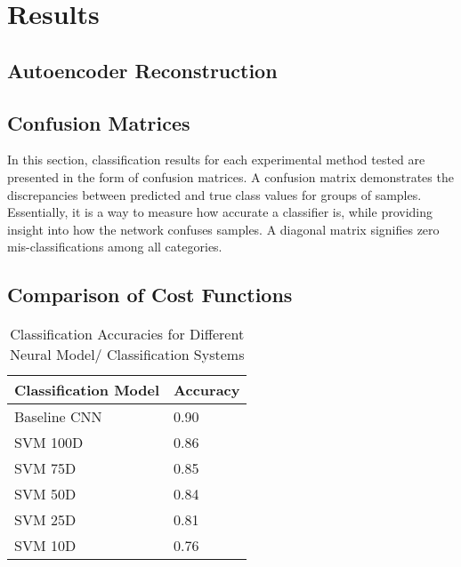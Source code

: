 \documentclass[conference]{IEEEtran}
\begin{document}
\section{Results} \label{Results}

\subsection{Autoencoder Reconstruction} \label{ae_reconstruction}



\subsection{Confusion Matrices}

In this section, classification results for each experimental method tested are presented in the form of confusion matrices.  A confusion matrix demonstrates the discrepancies between predicted and true class values for groups of samples.  Essentially, it is a way to measure how accurate a classifier is, while providing insight into how the network confuses samples.  A diagonal matrix signifies zero mis-classifications among all categories.

\subsection{Comparison of Cost Functions} \label{classification_accuracy}


\begin{table}[h!]
	\caption{Classification Accuracies for Different Neural Model/ Classification Systems}
	\label{tab:step1comparison}
	\normalsize
		\begin{tabularx}{\columnwidth}{ |X|X| } 
			\hline
			\centering \textbf{Classification Model}  & \textbf{Accuracy} \\
			\hline
			\centering Baseline CNN & 0.90 \\
			\hline
			\centering SVM 100D & 0.86 \\
			\hline
			\centering SVM 75D & 0.85 \\
			\hline
			\centering SVM 50D & 0.84 \\
			\hline
			\centering SVM 25D & 0.81 \\
			\hline
			\centering SVM 10D & 0.76 \\
			\hline
		\end{tabularx}
\end{table} 
 
\end{document}
